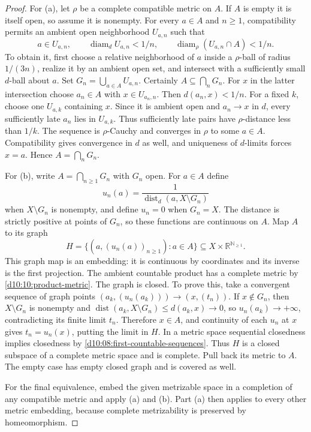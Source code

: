 \documentclass[11pt,oneside,openany]{book}
\theoremstyle{definition}
\theoremstyle{remark}
\newcommand{\R}{\mathbb R}\newcommand{\C}{\mathbb C}
\newcommand{\N}{\mathbb N}\newcommand{\Z}{\mathbb Z}\newcommand{\Q}{\mathbb Q}
\DeclareMathOperator{\diam}{diam}
\DeclareMathOperator{\dist}{dist}
\begin{document}
\begin{proof}
For (a), let $\rho$ be a complete compatible metric on $A$. If $A$ is empty it is itself open, so assume it is nonempty. For every $a\in A$ and $n\geq1$, compatibility permits an ambient open neighborhood $U_{a,n}$ such that
\[
 a\in U_{a,n},\qquad \diam_d U_{a,n}<1/n,\qquad
 \diam_\rho(U_{a,n}\cap A)<1/n.
\]
To obtain it, first choose a relative neighborhood of $a$ inside a $\rho$-ball of radius $1/(3n)$, realize it by an ambient open set, and intersect with a sufficiently small $d$-ball about $a$. Set $G_n=\bigcup_{a\in A}U_{a,n}$. Certainly $A\subseteq\bigcap_nG_n$. For $x$ in the latter intersection choose $a_n\in A$ with $x\in U_{a_n,n}$. Then $d(a_n,x)<1/n$. For a fixed $k$, choose one $U_{a,k}$ containing $x$. Since it is ambient open and $a_n\to x$ in $d$, every sufficiently late $a_n$ lies in $U_{a,k}$. Thus sufficiently late pairs have $\rho$-distance less than $1/k$. The sequence is $\rho$-Cauchy and converges in $\rho$ to some $a\in A$. Compatibility gives convergence in $d$ as well, and uniqueness of $d$-limits forces $x=a$. Hence $A=\bigcap_nG_n$.

For (b), write $A=\bigcap_{n\geq1}G_n$ with $G_n$ open. For $a\in A$ define
\[
 u_n(a)=\frac{1}{\dist_d(a,X\setminus G_n)}
\]
when $X\setminus G_n$ is nonempty, and define $u_n=0$ when $G_n=X$. The distance is strictly positive at points of $G_n$, so these functions are continuous on $A$. Map $A$ to its graph
\[
 H=\{(a,(u_n(a))_{n\geq1}):a\in A\}\subseteq X\times\R^{\N_{\geq1}}.
\]
This graph map is an embedding: it is continuous by coordinates and its inverse is the first projection. The ambient countable product has a complete metric by \cref{d10:10:product-metric}. The graph is closed. To prove this, take a convergent sequence of graph points $(a_k,(u_n(a_k)))\to(x,(t_n))$. If $x\notin G_n$, then $X\setminus G_n$ is nonempty and $\dist(a_k,X\setminus G_n)\leq d(a_k,x)\to0$, so $u_n(a_k)\to+\infty$, contradicting its finite limit $t_n$. Therefore $x\in A$, and continuity of each $u_n$ at $x$ gives $t_n=u_n(x)$, putting the limit in $H$. In a metric space sequential closedness implies closedness by \cref{d10:08:first-countable-sequences}. Thus $H$ is a closed subspace of a complete metric space and is complete. Pull back its metric to $A$. The empty case has empty closed graph and is covered as well.

For the final equivalence, embed the given metrizable space in a completion of any compatible metric and apply (a) and (b). Part (a) then applies to every other metric embedding, because complete metrizability is preserved by homeomorphism.
\end{proof}
\end{document}
